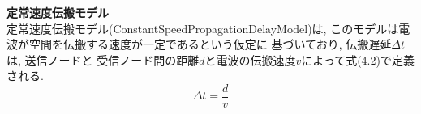 {\LARGE\textbf{定常速度伝搬モデル}}\\
\indent 定常速度伝搬モデル(ConstantSpeedPropagationDelayModel)は, 
このモデルは電波が空間を伝搬する速度が一定であるという仮定に
基づいており, 伝搬遅延$\Delta t$は, 送信ノードと
受信ノード間の距離$d$と電波の伝搬速度$v$によって式(4.2)で定義される.
\begin{equation}
  \Delta t = \frac{d}{v}
\end{equation}
